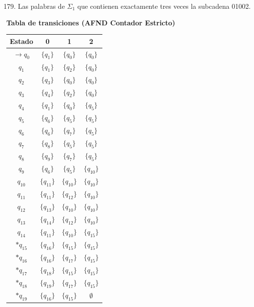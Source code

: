 \documentclass[12pt]{article}
\begin{document}
\vspace{0.3cm}
\begin{enumerate}
\setcounter{enumi}{178}
\item Las palabras de $\Sigma_1$ que contienen exactamente tres veces la subcadena 01002.
\end{enumerate}
\begin{minipage}{0.45\textwidth}
\begin{center}
    \textbf{Tabla de transiciones (AFND Contador Estricto)} \\
    \vspace{0.3cm}
    \begin{tabular}{c|ccc}
        Estado & 0 & 1 & 2 \\
	\hline
        $\rightarrow q_0$ & $\{q_1\}$ & $\{q_0\}$ & $\{q_0\}$ \\
        $q_1$ & $\{q_1\}$ & $\{q_2\}$ & $\{q_0\}$ \\
        $q_2$ & $\{q_3\}$ & $\{q_0\}$ & $\{q_0\}$ \\
        $q_3$ & $\{q_4\}$ & $\{q_2\}$ & $\{q_0\}$ \\
        $q_4$ & $\{q_1\}$ & $\{q_0\}$ & $\{q_5\}$ \\
        $q_5$ & $\{q_6\}$ & $\{q_5\}$ & $\{q_5\}$ \\
        $q_6$ & $\{q_6\}$ & $\{q_7\}$ & $\{q_5\}$ \\
        $q_7$ & $\{q_8\}$ & $\{q_5\}$ & $\{q_5\}$ \\
        $q_8$ & $\{q_9\}$ & $\{q_7\}$ & $\{q_5\}$ \\
        $q_9$ & $\{q_6\}$ & $\{q_5\}$ & $\{q_{10}\}$ \\
        $q_{10}$ & $\{q_{11}\}$ & $\{q_{10}\}$ & $\{q_{10}\}$ \\
        $q_{11}$ & $\{q_{11}\}$ & $\{q_{12}\}$ & $\{q_{10}\}$ \\
        $q_{12}$ & $\{q_{13}\}$ & $\{q_{10}\}$ & $\{q_{10}\}$ \\
        $q_{13}$ & $\{q_{14}\}$ & $\{q_{12}\}$ & $\{q_{10}\}$ \\
        $q_{14}$ & $\{q_{11}\}$ & $\{q_{10}\}$ & $\{q_{15}\}$ \\
        $*q_{15}$ & $\{q_{16}\}$ & $\{q_{15}\}$ & $\{q_{15}\}$ \\
        $*q_{16}$ & $\{q_{16}\}$ & $\{q_{17}\}$ & $\{q_{15}\}$ \\
        $*q_{17}$ & $\{q_{18}\}$ & $\{q_{15}\}$ & $\{q_{15}\}$ \\
        $*q_{18}$ & $\{q_{19}\}$ & $\{q_{17}\}$ & $\{q_{15}\}$ \\
        $*q_{19}$ & $\{q_{16}\}$ & $\{q_{15}\}$ & $\emptyset$ \\
    \end{tabular}
\end{center}
\end{minipage}
\end{document}
